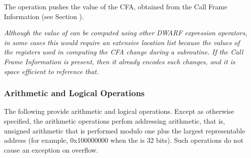 \begin{enumerate}[1. ]
The  operation pushes the value of the
CFA, obtained from the Call Frame Information 
(see Section ).

\textit{Although the value of 
can be computed using other DWARF expression operators,
in some cases this would require an extensive location list
because the values of the registers used in computing the
CFA change during a subroutine. If the 
Call Frame Information 
is present, then it already encodes such changes, and it is
space efficient to reference that.}
\end{enumerate}

\subsubsection{Arithmetic and Logical Operations}
The 
following 
provide arithmetic and logical operations. Except
as otherwise specified, the arithmetic operations perfom
addressing arithmetic, that is, unsigned arithmetic that is
performed modulo one plus the largest representable address
(for example, 0x100000000 when the 
 is 32
bits). 
Such operations do not cause an exception on overflow.
